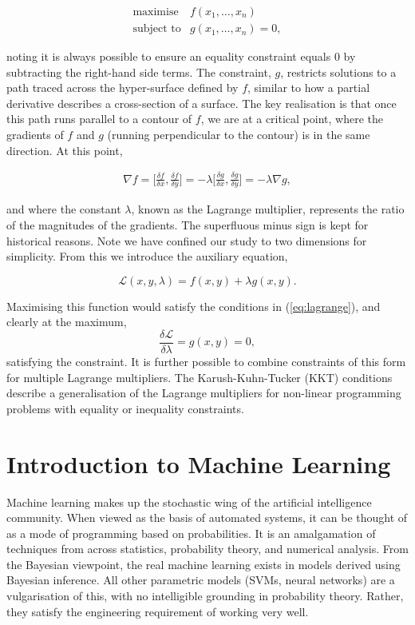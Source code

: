 \documentclass[11pt]{amsart}
\begin{document}
$$
\begin{array}{rl}
\text{maximise} & f(x_1, \dots, x_n) \\
\text{subject to} & g(x_1, \dots, x_n) = 0,
\end{array}
$$

noting it is always possible to ensure an equality constraint equals 0 by subtracting the right-hand side terms. The constraint, $g$, restricts solutions to a path traced across the hyper-surface defined by $f$, similar to how a partial derivative describes a cross-section of a surface. The key realisation is that once this path runs parallel to a contour of $f$, we are at a critical point, where the gradients of $f$ and $g$ (running perpendicular to the contour) is in the same direction. At this point,

\begin{align}\nabla f = \bigg[\frac{\delta f}{\delta x}, \frac{\delta f}{\delta y}\bigg] = -\lambda\bigg[\frac{\delta g}{\delta x}, \frac{\delta g}{\delta y}\bigg] = -\lambda\nabla g \label{eq:lagrange},
\end{align}

and where the constant $\lambda$, known as the Lagrange multiplier, represents the ratio of the magnitudes of the gradients. The superfluous minus sign is kept for historical reasons. Note we have confined our study to two dimensions for simplicity. From this we introduce the auxiliary equation,

$$\mathcal{L}(x, y, \lambda) = f(x, y) + \lambda g(x, y).$$

Maximising this function would satisfy the conditions in (\ref{eq:lagrange}), and clearly at the maximum, $$\frac{\delta\mathcal{L}}{\delta\lambda} = g(x, y) = 0,$$ satisfying the constraint. It is further possible to combine constraints of this form for multiple Lagrange multipliers. The Karush-Kuhn-Tucker (KKT) conditions describe a generalisation of the Lagrange multipliers for non-linear programming problems with equality or inequality constraints.

\section{Introduction to Machine Learning}

Machine learning makes up the stochastic wing of the artificial intelligence community. When viewed as the basis of automated systems, it can be thought of as a mode of programming based on probabilities. It is an amalgamation of techniques from across statistics, probability theory, and numerical analysis. From the Bayesian viewpoint, the real machine learning exists in models derived using Bayesian inference. All other parametric models (SVMs, neural networks) are a vulgarisation of this, with no intelligible grounding in probability theory. Rather, they satisfy the engineering requirement of working very well.
\end{document}

